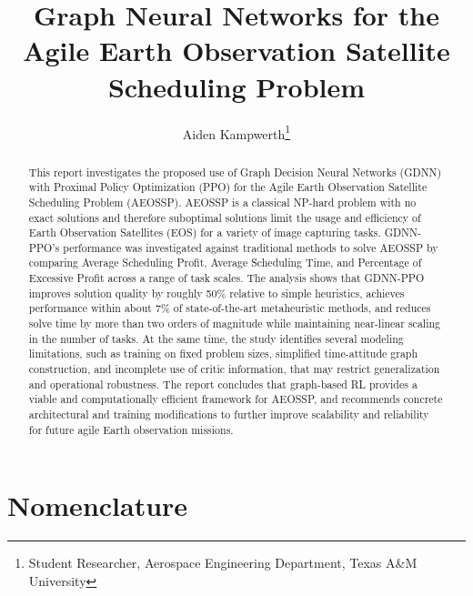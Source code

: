 \documentclass[conf]{new-aiaa}
\title{Graph Neural Networks for the Agile Earth Observation Satellite Scheduling Problem}
\author{Aiden Kampwerth\footnote{Student Researcher, Aerospace Engineering Department, Texas A\&M University}}
\begin{document}
\maketitle

\begin{abstract}
This report investigates the proposed use of Graph Decision Neural Networks (GDNN) with Proximal Policy Optimization (PPO) for the Agile Earth Observation Satellite Scheduling Problem (AEOSSP).
AEOSSP is a classical NP-hard problem with no exact solutions and therefore suboptimal solutions limit the usage and efficiency of Earth Observation Satellites (EOS) for a variety of image capturing tasks.
GDNN-PPO’s performance was investigated against traditional methods to solve AEOSSP by comparing Average Scheduling Profit, Average Scheduling Time, and Percentage of Excessive Profit across a range of task scales.
The analysis shows that GDNN-PPO improves solution quality by roughly 50\% relative to simple heuristics, achieves performance within about 7\% of state-of-the-art metaheuristic methods, and reduces solve time by more than two orders of magnitude while maintaining near-linear scaling in the number of tasks.
At the same time, the study identifies several modeling limitations, such as training on fixed problem sizes, simplified time-attitude graph construction, and incomplete use of critic information, that may restrict generalization and operational robustness.
The report concludes that graph-based RL provides a viable and computationally efficient framework for AEOSSP, and recommends concrete architectural and training modifications to further improve scalability and reliability for future agile Earth observation missions.
\end{abstract}

\section{Nomenclature}
\end{document}
